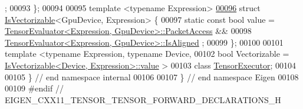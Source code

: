 \begin{DoxyCode}
      ;
00093 \};
00094 
00095 \textcolor{keyword}{template} <\textcolor{keyword}{typename} Expression>
\hyperlink{struct_eigen_1_1internal_1_1_is_vectorizable_3_01_gpu_device_00_01_expression_01_4}{00096} \textcolor{keyword}{struct }\hyperlink{struct_eigen_1_1internal_1_1_is_vectorizable}{IsVectorizable}<GpuDevice, Expression> \{
00097   \textcolor{keyword}{static} \textcolor{keyword}{const} \textcolor{keywordtype}{bool} value = \hyperlink{struct_eigen_1_1_tensor_evaluator}{TensorEvaluator<Expression, GpuDevice>::PacketAccess}
       &&
00098                             \hyperlink{struct_eigen_1_1_tensor_evaluator}{TensorEvaluator<Expression, GpuDevice>::IsAligned}
      ;
00099 \};
00100 
00101 \textcolor{keyword}{template} <\textcolor{keyword}{typename} Expression, \textcolor{keyword}{typename} Device,
00102           \textcolor{keywordtype}{bool} Vectorizable = \hyperlink{struct_eigen_1_1internal_1_1_is_vectorizable}{IsVectorizable<Device, Expression>::value}
      >
00103 \textcolor{keyword}{class }\hyperlink{class_eigen_1_1internal_1_1_tensor_executor}{TensorExecutor};
00104 
00105 \}  \textcolor{comment}{// end namespace internal}
00106 
00107 \}  \textcolor{comment}{// end namespace Eigen}
00108 
00109 \textcolor{preprocessor}{#endif // EIGEN\_CXX11\_TENSOR\_TENSOR\_FORWARD\_DECLARATIONS\_H}
\end{DoxyCode}
